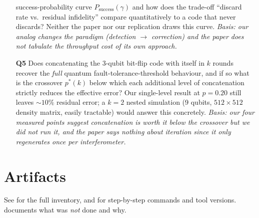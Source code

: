 \documentclass[11pt]{article}
\begin{document}
\begin{itemize}
    success-probability curve $P_{\text{success}}(\gamma)$ and how does
    the trade-off ``discard rate vs.\ residual infidelity'' compare
    quantitatively to a code that never discards?  Neither the paper nor
    our replication draws this curve.
    \emph{Basis: our analog changes the paradigm (detection $\to$
    correction) and the paper does not tabulate the throughput cost of
    its own approach.}
    \item[\textbf{Q5}] Does concatenating the 3-qubit bit-flip code with
    itself in $k$ rounds recover the \emph{full} quantum
    fault-tolerance-threshold behaviour, and if so what is the crossover
    $p^{*}(k)$ below which each additional level of concatenation
    strictly reduces the effective error? Our single-level result at
    $p=0.20$ still leaves $\sim\!10\%$ residual error; a $k=2$ nested
    simulation (9 qubits, $512\times 512$ density matrix, easily
    tractable) would answer this concretely.
    \emph{Basis: our four measured points suggest concatenation is worth
    it below the crossover but we did not run it, and the paper says
    nothing about iteration since it only regenerates once per
    interferometer.}
\end{itemize}

\section{Artifacts}
See  for the full inventory, and
 for step-by-step commands and tool versions.
 documents what was \emph{not} done and
why.
\end{document}
